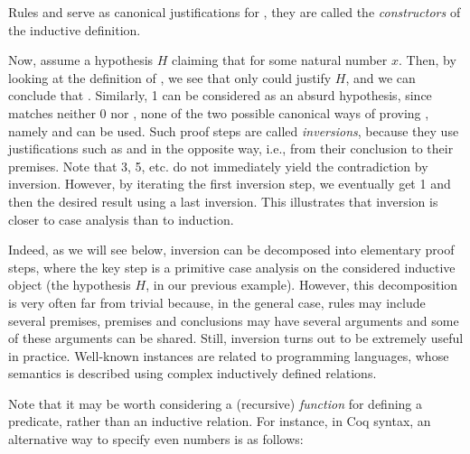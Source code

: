 
\noindent
Rules  and 
serve as canonical justifications for , 
they are called the \emph{constructors} of the inductive definition.

Now, assume a hypothesis $H$ claiming
that  for some natural number $x$.
Then, by looking at the definition of , 
we see that only  could justify $H$,
and we can conclude that .
Similarly,   1 can be considered as an
absurd hypothesis, since  matches neither
0 nor , 
none of the two possible canonical ways of proving ,
namely  and  can be used.
Such proof steps are called \emph{inversions},
because they use justifications such as  and 
in the opposite way, i.e.,
from their conclusion to their premises. 
Note that  3,  5, etc. 
do not immediately yield the contradiction by inversion.
However, by iterating the first inversion step, we eventually get
 1 and then the desired result using a last inversion.
This illustrates that inversion is closer to case analysis than to induction.

Indeed, as we will see below, 
inversion can be decomposed into elementary proof steps,
where the key step is a primitive case analysis on the considered
inductive object (the hypothesis $H$, in our previous example). 
However, this decomposition is very often far from trivial because,
in the general case, rules may include several premises,
premises and conclusions may have several arguments and
some of these arguments can be shared.
Still, inversion turns out to be extremely useful in practice.
Well-known instances are related to programming languages,
whose semantics is described using complex inductively defined
relations. 

Note that it may be worth considering a (recursive) \emph{function}
for defining a predicate, rather than an inductive relation.
For instance, in Coq syntax, an alternative way to specify even
numbers is as follows:


